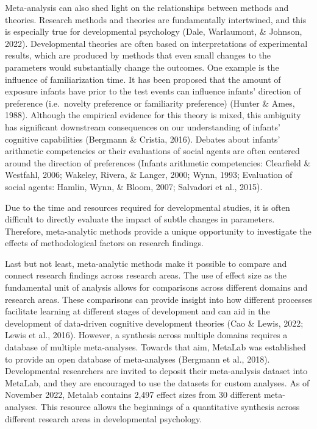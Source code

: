 \documentclass[10pt, letterpaper]{article}
\begin{document}
Meta-analysis can also shed light on the relationships between methods
and theories. Research methods and theories are fundamentally
intertwined, and this is especially true for developmental psychology
(Dale, Warlaumont, \& Johnson, 2022). Developmental theories are often
based on interpretations of experimental results, which are produced by
methods that even small changes to the parameters would substantially
change the outcomes. One example is the influence of familiarization
time. It has been proposed that the amount of exposure infants have
prior to the test events can influence infants' direction of preference
(i.e.~novelty preference or familiarity preference) (Hunter \& Ames,
1988). Although the empirical evidence for this theory is mixed, this
ambiguity has significant downstream consequences on our understanding
of infants' cognitive capabilities (Bergmann \& Cristia, 2016). Debates
about infants' arithmetic competencies or their evaluations of social
agents are often centered around the direction of preferences (Infants
arithmetic competencies: Clearfield \& Westfahl, 2006; Wakeley, Rivera,
\& Langer, 2000; Wynn, 1993; Evaluation of social agents: Hamlin, Wynn,
\& Bloom, 2007; Salvadori et al., 2015).

Due to the time and resources required for developmental studies, it is
often difficult to directly evaluate the impact of subtle changes in
parameters. Therefore, meta-analytic methods provide a unique
opportunity to investigate the effects of methodological factors on
research findings.

Last but not least, meta-analytic methods make it possible to compare
and connect research findings across research areas. The use of effect
size as the fundamental unit of analysis allows for comparisons across
different domains and research areas. These comparisons can provide
insight into how different processes facilitate learning at different
stages of development and can aid in the development of data-driven
cognitive development theories (Cao \& Lewis, 2022; Lewis et al., 2016).
However, a synthesis across multiple domains requires a database of
multiple meta-analyses. Towards that aim, MetaLab was established to
provide an open database of meta-analyses (Bergmann et al., 2018).
Developmental researchers are invited to deposit their meta-analysis
dataset into MetaLab, and they are encouraged to use the datasets for
custom analyses. As of November 2022, Metalab contains 2,497 effect
sizes from 30 different meta-analyses. This resource allows the
beginnings of a quantitative synthesis across different research areas
in developmental psychology.
\end{document}
